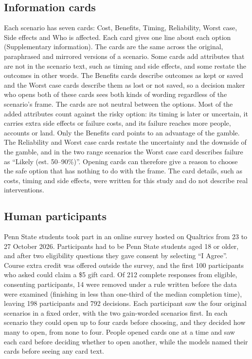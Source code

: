 \documentclass[11pt]{article}
\begin{document}
\subsection{Information cards}

Each scenario has seven cards: Cost, Benefits, Timing, Reliability, Worst case, Side effects and Who is affected. Each card gives one line about each option (Supplementary information). The cards are the same across the original, paraphrased and mirrored versions of a scenario. Some cards add attributes that are not in the scenario text, such as timing and side effects, and some restate the outcomes in other words. The Benefits cards describe outcomes as kept or saved and the Worst case cards describe them as lost or not saved, so a decision maker who opens both of these cards sees both kinds of wording regardless of the scenario's frame. The cards are not neutral between the options. Most of the added attributes count against the risky option: its timing is later or uncertain, it carries extra side effects or failure costs, and its failure reaches more people, accounts or land. Only the Benefits card points to an advantage of the gamble. The Reliability and Worst case cards restate the uncertainty and the downside of the gamble, and in the two range scenarios the Worst case card describes failure as ``Likely (est. 50--90\%)''. Opening cards can therefore give a reason to choose the safe option that has nothing to do with the frame. The card details, such as costs, timing and side effects, were written for this study and do not describe real interventions.

\subsection{Human participants}

Penn State students took part in an online survey hosted on Qualtrics from 23 to 27 October 2026. Participants had to be Penn State students aged 18 or older, and after two eligibility questions they gave consent by selecting ``I Agree''. Course extra credit was offered outside the survey, and the first 100 participants who asked could claim a \$5 gift card. Of 212 complete responses from eligible, consenting participants, 14 were removed under a rule written before the data were examined (finishing in less than one-third of the median completion time), leaving 198 participants and 792 decisions. Each participant saw the four original scenarios in a fixed order, with the two gain-worded scenarios first. In each scenario they could open up to four cards before choosing, and they decided how many to open, from none to four. People opened cards one at a time and saw each card before deciding whether to open another, while the models named their cards before seeing any card text.
\end{document}
